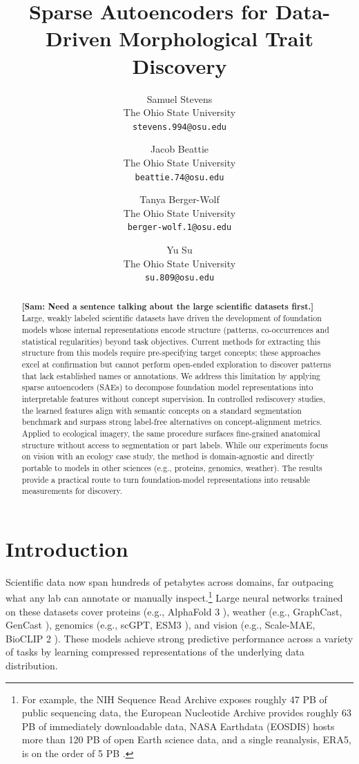 \documentclass[10pt,twocolumn,letterpaper]{article}
\title{Sparse Autoencoders for Data-Driven Morphological Trait Discovery}
\author{Samuel Stevens\\
The Ohio State University\\
\texttt{stevens.994@osu.edu}\\
\and
Jacob Beattie\\
The Ohio State University\\
\texttt{beattie.74@osu.edu}\\
\and
Tanya Berger-Wolf\\
The Ohio State University\\
\texttt{berger-wolf.1@osu.edu}\\
\and
Yu Su\\
The Ohio State University\\
\texttt{su.809@osu.edu}
}
\newcommand{\sam}[1]{\textbf{\color{blue}[Sam: #1]}}
\begin{document}
\maketitle

\begin{abstract}
\sam{Need a sentence talking about the large scientific datasets first.}
Large, weakly labeled scientific datasets have driven the development of foundation models whose internal representations encode structure (patterns, co-occurrences and statistical regularities) beyond task objectives.
Current methods for extracting this structure from this models require pre-specifying target concepts; these approaches excel at confirmation but cannot perform open-ended exploration to discover patterns that lack established names or annotations.
We address this limitation by applying sparse autoencoders (SAEs) to decompose foundation model representations into interpretable features without concept supervision.
In controlled rediscovery studies, the learned features align with semantic concepts on a standard segmentation benchmark and surpass strong label-free alternatives on concept-alignment metrics.
Applied to ecological imagery, the same procedure surfaces fine-grained anatomical structure without access to segmentation or part labels.
While our experiments focus on vision with an ecology case study, the method is domain-agnostic and directly portable to models in other sciences (e.g., proteins, genomics, weather).
The results provide a practical route to turn foundation-model representations into reusable measurements for discovery.
\end{abstract}

\section{Introduction}

Scientific data now span hundreds of petabytes across domains, far outpacing what any lab can annotate or manually inspect.\footnote{For example, the NIH Sequence Read Archive exposes roughly 47 PB of public sequencing data, the European Nucleotide Archive provides roughly 63 PB of immediately downloadable data, NASA Earthdata (EOSDIS) hosts more than 120 PB of open Earth science data, and a single reanalysis, ERA5, is on the order of 5 PB \citep{SRA2024,ENA2024,NASA_EOSDIS,ERA5}.}
Large neural networks trained on these datasets cover proteins (e.g., AlphaFold 3 \citep{abramson2024alphafold3}), weather (e.g., GraphCast, GenCast \citep{lam2023graphcast,price2025gencast}), genomics (e.g., scGPT, ESM3 \citep{cui2024scgpt,hayes2025esm3}), and vision (e.g., Scale-MAE, BioCLIP 2 \citep{reed2023scale,gu2025bioclip2}).
These models achieve strong predictive performance across a variety of tasks by learning compressed representations of the underlying data distribution.
\end{document}
